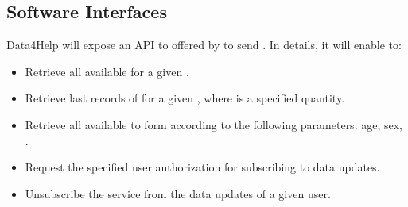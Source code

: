 \documentclass[../../../rasd.tex]{subfiles}
\begin{document}
\subsection{Software Interfaces}
			Data4Help will expose an API to  offered by  to send . In details, it will enable to:
			\begin{itemize}
				\item Retrieve all  available for a given .
				\item Retrieve last  records of  for a given , where  is a specified quantity.
				\item Retrieve all  available to form  according to the following parameters: age, sex, .
				\item Request the specified user authorization for subscribing to data updates.
				\item Unsubscribe the service from the data updates of a given user.
			\end{itemize}
\end{document}
